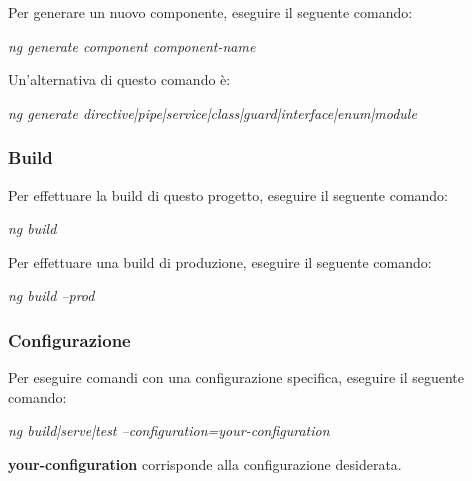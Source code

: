 \documentclass[../manuale-sviluppatore.tex]{subfiles}
\begin{document}
Per generare un nuovo componente, eseguire il seguente comando: \par\bigskip

\begin{center}
  \textit{ng generate component component-name}
\end{center}
\par\bigskip

Un'alternativa di questo comando è: \par\bigskip

\begin{center}
  \textit{ng generate directive|pipe|service|class|guard|interface|enum|module}
\end{center}
\par\bigskip

\subsubsection{Build}%
\label{subs:build}

Per effettuare la build di questo progetto, eseguire il seguente comando: \par\bigskip

\begin{center}
  \textit{ng build}
\end{center}
\par\bigskip

Per effettuare una build di produzione, eseguire il seguente comando: \par\bigskip

\begin{center}
  \textit{ng build --prod}
\end{center}
\par\bigskip

\subsubsection{Configurazione}%
\label{subs:configurazione}

Per eseguire comandi con una configurazione specifica, eseguire il seguente comando: \par\bigskip

\begin{center}
  \textit{ng build|serve|test --configuration=your-configuration}
\end{center}
\par\bigskip

\textbf{your-configuration} corrisponde alla configurazione desiderata.
\end{document}
